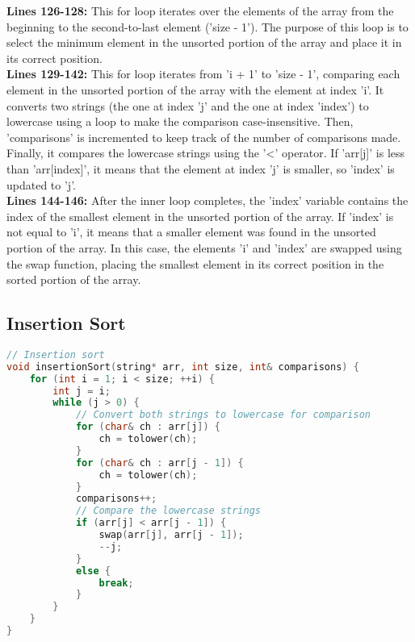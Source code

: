 \documentclass[letterpaper, 10pt,DIV=13]{scrartcl}
\numberwithin{equation}{section} %
\numberwithin{figure}{section} %
\numberwithin{table}{section} %
\begin{document}
\textbf{Lines 126-128:} This for loop iterates over the elements of the array from the beginning to the second-to-last element ('size - 1'). The purpose of this loop is to select the minimum element in the unsorted portion of the array and place it in its correct position. \\
\textbf{Lines 129-142:} This for loop iterates from 'i + 1' to 'size - 1', comparing each element in the unsorted portion of the array with the element at index 'i'. It converts two strings (the one at index 'j' and the one at index 'index') to lowercase using a loop to make the comparison case-insensitive. Then, 'comparisons' is incremented to keep track of the number of comparisons made. Finally, it compares the lowercase strings using the '<' operator. If 'arr[j]' is less than 'arr[index]', it means that the element at index 'j' is smaller, so 'index' is updated to 'j'. \\
\textbf{Lines 144-146:} After the inner loop completes, the 'index' variable contains the index of the smallest element in the unsorted portion of the array. If 'index' is not equal to 'i', it means that a smaller element was found in the unsorted portion of the array. In this case, the elements 'i' and 'index' are swapped using the swap function, placing the smallest element in its correct position in the sorted portion of the array.

\subsection{Insertion Sort}
\begin{linenumbers}
\begin{lstlisting}[language=C++, caption={Insertion Sort}, label={code:example}]
// Insertion sort
void insertionSort(string* arr, int size, int& comparisons) {
    for (int i = 1; i < size; ++i) {
        int j = i;
        while (j > 0) {
            // Convert both strings to lowercase for comparison
            for (char& ch : arr[j]) {
                ch = tolower(ch);
            }
            for (char& ch : arr[j - 1]) {
                ch = tolower(ch);
            }
            comparisons++;
            // Compare the lowercase strings
            if (arr[j] < arr[j - 1]) {
                swap(arr[j], arr[j - 1]);
                --j;
            }
            else {
                break;
            }
        }
    }
}
\end{lstlisting}
\end{linenumbers}
\nolinenumbers
\end{document}
